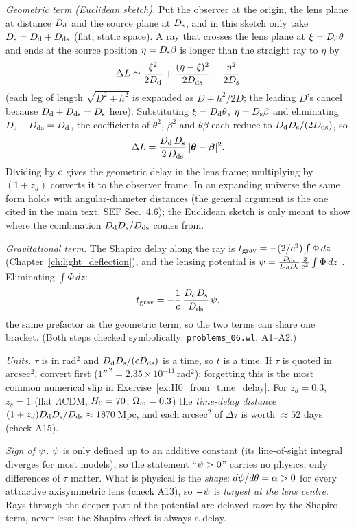 \begin{derivation}
\textit{Geometric term (Euclidean sketch).}  Put the observer at the origin,
the lens plane at distance $D_{\mathrm{d}}$ and the source plane at $D_{\mathrm{s}}$, and in this
sketch only take $D_{\mathrm{s}} = D_{\mathrm{d}} + D_{\mathrm{ds}}$ (flat, static space).  A ray that crosses the
lens plane at $\xi = D_{\mathrm{d}}\theta$ and ends at the source position
$\eta = D_{\mathrm{s}}\beta$ is longer than the straight ray to $\eta$ by
\[
  \Delta L \simeq \frac{\xi^2}{2D_{\mathrm{d}}} + \frac{(\eta-\xi)^2}{2D_{\mathrm{ds}}}
  - \frac{\eta^2}{2D_{\mathrm{s}}}
\]
(each leg of length $\sqrt{D^2+h^2}$ is expanded as $D + h^2/2D$; the
leading $D$'s cancel because $D_{\mathrm{d}}+D_{\mathrm{ds}} = D_{\mathrm{s}}$ here).  Substituting
$\xi=D_{\mathrm{d}}\theta$, $\eta=D_{\mathrm{s}}\beta$ and eliminating $D_{\mathrm{s}}-D_{\mathrm{ds}}=D_{\mathrm{d}}$, the
coefficients of $\theta^2$, $\beta^2$ and $\theta\beta$ each reduce to
$D_{\mathrm{d}}D_{\mathrm{s}}/(2D_{\mathrm{ds}})$, so
\[
  \Delta L = \frac{D_{\mathrm{d}}\,D_{\mathrm{s}}}{2\,D_{\mathrm{ds}}}\,|\boldsymbol{\theta}-\boldsymbol{\beta}|^2 .
\]
Dividing by $c$ gives the geometric delay in the lens frame;
multiplying by $(1+z_d)$ converts it to the observer frame.  In an
expanding universe the same form holds with angular-diameter distances
(the general argument is the one cited in the main text, SEF Sec.~4.6);
the Euclidean sketch is only meant to show where the combination
$D_{\mathrm{d}}D_{\mathrm{s}}/D_{\mathrm{ds}}$ comes from.

\textit{Gravitational term.}  The Shapiro delay along the ray is
$t_{\rm grav} = -(2/c^3)\int\Phi\,dz$ (Chapter~\ref{ch:light_deflection}),
and the lensing potential is
$\psi = \frac{D_{\mathrm{ds}}}{D_{\mathrm{d}}D_{\mathrm{s}}}\frac{2}{c^2}\int\Phi\,dz$
\citep[eq.~48]{narayan_lectures_1997}.  Eliminating $\int\Phi\,dz$:
\[
  t_{\rm grav} = -\frac{1}{c}\,\frac{D_{\mathrm{d}}D_{\mathrm{s}}}{D_{\mathrm{ds}}}\,\psi ,
\]
the same prefactor as the geometric term, so the two terms can share one
bracket.
(Both steps checked symbolically: \texttt{problems\_06.wl}, A1--A2.)
\end{derivation}

\begin{annotation}
\emph{Units.}  $\tau$ is in rad$^2$ and $D_{\mathrm{d}}D_{\mathrm{s}}/(cD_{\mathrm{ds}})$ is a time,
so $t$ is a time.  If $\tau$ is quoted in arcsec$^2$, convert first
($1''^{\,2} = 2.35\times10^{-11}$\,rad$^2$); forgetting this is the most common
numerical slip in Exercise~\ref{ex:H0_from_time_delay}.
For $z_d=0.3$, $z_s=1$ (flat $\Lambda$CDM, $H_0=70$, $\Omega_{\mathrm{m}}=0.3$) the
\emph{time-delay distance} $(1+z_d)D_{\mathrm{d}}D_{\mathrm{s}}/D_{\mathrm{ds}} \approx 1870$\,Mpc, and each
arcsec$^2$ of $\Delta\tau$ is worth $\approx 52$ days (check A15).

\emph{Sign of $\psi$.}  $\psi$ is only defined up to an additive constant
(its line-of-sight integral diverges for most models), so the statement
``$\psi>0$'' carries no physics; only differences of $\tau$ matter.  What is
physical is the \emph{shape}: $d\psi/d\theta = \alpha > 0$ for every
attractive axisymmetric lens (check A13), so $-\psi$ is \emph{largest at the
lens centre}.  Rays through the deeper part of the potential are delayed
\emph{more} by the Shapiro term, never less: the Shapiro effect is always
a delay.
\end{annotation}

